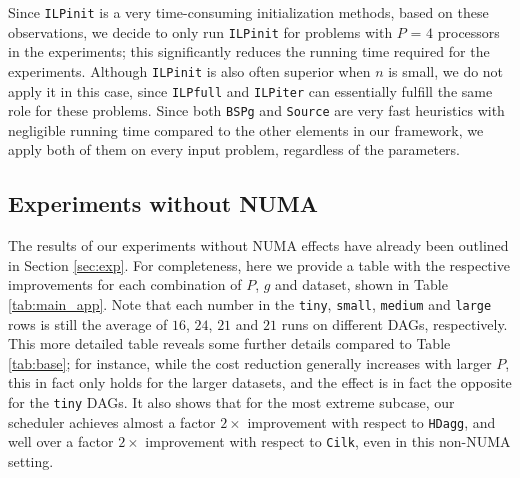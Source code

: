 \documentclass[sigconf,nonacm]{acmart}
\begin{document}
Since \texttt{ILPinit} is a very time-consuming initialization methods, based on these observations, we decide to only run \texttt{ILPinit} for problems with $P_{\!}=_{\!}4$ processors in the experiments; this significantly reduces the running time required for the experiments. Although \texttt{ILPinit} is also often superior when $n$ is small, we do not apply it in this case, since \texttt{ILPfull} and \texttt{ILPiter} can essentially fulfill the same role for these problems. Since both \texttt{BSPg} and \texttt{Source} are very fast heuristics with negligible running time compared to the other elements in our framework, we apply both of them on every input problem, regardless of the parameters.

\subsection{Experiments without NUMA}

The results of our experiments without NUMA effects have already been outlined in Section \ref{sec:exp}. For completeness, here we provide a table with the respective improvements for each combination of $P$, $g$ and dataset, shown in Table \ref{tab:main_app}. Note that each number in the \texttt{tiny}, \texttt{small}, \texttt{medium} and \texttt{large} rows is still the average of $16$, $24$, $21$ and $21$ runs on different DAGs, respectively. This more detailed table reveals some further details compared to Table \ref{tab:base}; for instance, while the cost reduction generally increases with larger $P$, this in fact only holds for the larger datasets, and the effect is in fact the opposite for the \texttt{tiny} DAGs. It also shows that for the most extreme subcase, our scheduler achieves almost a factor $2\times$ improvement with respect to \texttt{HDagg}, and well over a factor $2\times$ improvement with respect to \texttt{Cilk}, even in this non-NUMA setting.
\end{document}

